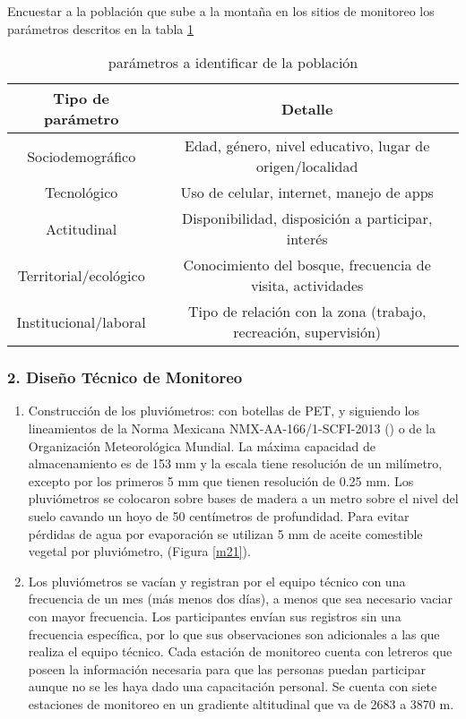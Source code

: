 Encuestar a la población que sube a la montaña en los sitios de monitoreo los parámetros descritos en la tabla \ref{tabt3}
\begin{table}[h!]
\centering
\begin{tabular}{@{}cc@{}}
\toprule
Tipo de parámetro & Detalle                                           \\ \midrule
Sociodemográfico      & Edad, género, nivel educativo, lugar de origen/localidad          \\
Tecnológico       & Uso de celular, internet, manejo de apps          \\
Actitudinal       & Disponibilidad, disposición a participar, interés \\
Territorial/ecológico & Conocimiento del bosque, frecuencia de visita, actividades      \\
Institucional/laboral & Tipo de relación con la zona (trabajo, recreación, supervisión) \\ \bottomrule
\end{tabular}
\caption{parámetros a identificar de la población}
\label{tabt3}
\end{table}
\newpage
\subsubsection{2. Diseño Técnico de Monitoreo}

\begin{enumerate}
    \item Construcción de los pluviómetros: con botellas de PET, y siguiendo los lineamientos de la Norma Mexicana NMX-AA-166/1-SCFI-2013 (\cite{se2013}) o de la Organización Meteorológica Mundial. La máxima capacidad de almacenamiento es de 153 mm y la escala tiene resolución de un milímetro, excepto por los primeros 5 mm que tienen resolución de 0.25 mm. Los pluviómetros se colocaron sobre bases de madera a un metro sobre el nivel del suelo cavando un hoyo de 50 centímetros de profundidad. Para evitar pérdidas de agua por evaporación se utilizan 5 mm de aceite comestible vegetal por pluviómetro, (Figura \ref{m21}).

    \item Los pluviómetros se vacían y registran por el equipo técnico con una frecuencia de un mes (más menos dos días), a menos que sea necesario vaciar con mayor frecuencia. Los participantes envían sus registros sin una frecuencia específica, por lo que sus observaciones son adicionales a las que realiza el equipo técnico. Cada estación de monitoreo cuenta con letreros que poseen la información necesaria para que las personas puedan participar aunque no se les haya dado una capacitación personal. Se cuenta con siete estaciones de monitoreo en un gradiente altitudinal que va de 2683 a 3870 m. 
\end{enumerate}


